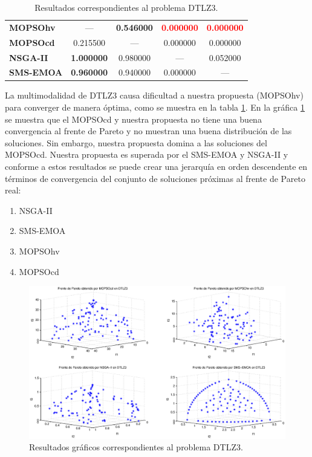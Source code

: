 \begin{table}
\begin{center}
\begin{tabular}{|l|cc|cc|}
	\textbf{MOPSOhv} &---       & \textbf{0.546000} & \textbf{\textcolor{red}{ 0.000000 }}  &  \textbf{\textcolor{red}{0.000000 }} \\ 
	\textbf{MOPSOcd} & 0.215500 & ---      & 0.000000 & 0.000000 \\ 
	\textbf{NSGA-II} & \textbf{1.000000} & 0.980000 & ---        & 0.052000 \\  
	\textbf{SMS-EMOA}& \textbf{0.960000} & 0.940000 & 0.000000   & --- \\  
	\hline
	\end{tabular}
\caption{Resultados correspondientes al problema DTLZ3.}
  \label{tab:dtlz3}
\end{center}
\end{table}
La multimodalidad de DTLZ3 causa dificultad a nuestra propuesta (MOPSOhv) para converger de manera \'optima, como se muestra en la 
tabla \ref{tab:dtlz3}. En la gr\'afica \ref{fig:rDTLZ3} se muestra que el MOPSOcd y nuestra propuesta no tiene una buena convergencia
al frente de Pareto y no muestran una buena distribuci\'on de las soluciones. Sin embargo, nuestra propuesta domina a las soluciones 
del MOPSOcd. Nuestra propuesta es superada por el SMS-EMOA y NSGA-II y conforme a estos resultados se puede crear una
jerarqu\'ia en orden descendente en t\'erminos de convergencia del conjunto de soluciones pr\'oximas al frente de Pareto real:

\begin{enumerate}
  \item NSGA-II
  \item SMS-EMOA
  \item MOPSOhv
  \item MOPSOcd
\end{enumerate}

\clearpage
\newpage

\begin{figure}
      \begin{center}
	  \includegraphics[scale=0.45]{Cap4/rdtlz3r.eps}
      \end{center}
	\caption{Resultados gr\'aficos correspondientes al problema DTLZ3.}
      \label{fig:rDTLZ3}
      \end{figure}

